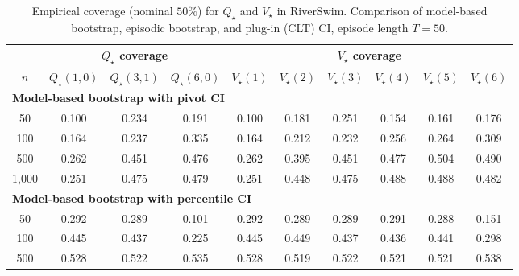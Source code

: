 \documentclass{article}
\numberwithin{equation}{section}
\begin{document}
\begin{table}[ht]
\centering
\caption{Empirical coverage (nominal $50\%$) for $Q_\star$ and $V_\star$ in RiverSwim. Comparison of model-based bootstrap, episodic bootstrap, and plug-in (CLT) CI, episode length $T=50$.}
\label{tab:riverswim-optimal-coverage-T50-50}
\begin{tabular}{c|ccc|cccccc}
\hline
& \multicolumn{3}{c|}{$Q_\star$ coverage} & \multicolumn{6}{c}{$V_\star$ coverage} \\ \hline
$n$
& $Q_\star(1,0)$ & $Q_\star(3,1)$ & $Q_\star(6,0)$
& $V_\star(1)$ & $V_\star(2)$ & $V_\star(3)$ & $V_\star(4)$ & $V_\star(5)$ & $V_\star(6)$ \\
\hline
\multicolumn{10}{l}{\textbf{Model-based bootstrap with pivot CI}} \\ \hline
50
& 0.100 & 0.234 & 0.191
& 0.100 & 0.181 & 0.251 & 0.154 & 0.161 & 0.176 \\
100
& 0.164 & 0.237 & \cellcolor{covheat!18!white}0.335
& 0.164 & 0.212 & 0.232 & 0.256 & 0.264 & \cellcolor{covheat!5!white}0.309 \\
500
& 0.262 & \cellcolor{covheat!76!white}0.451 & \cellcolor{covheat!88!white}0.476
& 0.262 & \cellcolor{covheat!48!white}0.395 & \cellcolor{covheat!76!white}0.451 & \cellcolor{covheat!88!white}0.477 & \cellcolor{covheat!100!white}0.504 & \cellcolor{covheat!95!white}0.490 \\
1{,}000
& 0.251 & \cellcolor{covheat!87!white}0.475 & \cellcolor{covheat!89!white}0.479
& 0.251 & \cellcolor{covheat!74!white}0.448 & \cellcolor{covheat!87!white}0.475 & \cellcolor{covheat!94!white}0.488 & \cellcolor{covheat!94!white}0.488 & \cellcolor{covheat!91!white}0.482 \\
\hline
\multicolumn{10}{l}{\textbf{Model-based bootstrap with percentile CI}} \\ \hline
50
& 0.292 & 0.289 & 0.101
& 0.292 & 0.289 & 0.289 & 0.291 & 0.288 & 0.151 \\
100
& \cellcolor{covheat!73!white}0.445 & \cellcolor{covheat!68!white}0.437 & 0.225
& \cellcolor{covheat!73!white}0.445 & \cellcolor{covheat!75!white}0.449 & \cellcolor{covheat!68!white}0.437 & \cellcolor{covheat!68!white}0.436 & \cellcolor{covheat!70!white}0.441 & 0.298 \\
500
& \cellcolor{covheat!100!white}0.528 & \cellcolor{covheat!100!white}0.522 & \cellcolor{covheat!100!white}0.535
& \cellcolor{covheat!100!white}0.528 & \cellcolor{covheat!100!white}0.519 & \cellcolor{covheat!100!white}0.522 & \cellcolor{covheat!100!white}0.521 & \cellcolor{covheat!100!white}0.521 & \cellcolor{covheat!100!white}0.538 \\

\end{tabular}
\end{table}
\end{document}
